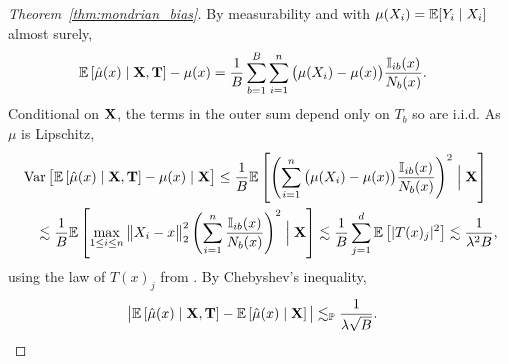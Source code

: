 \begin{proof}[Theorem~\ref{thm:mondrian_bias}]


  By measurability and with $\mu(X_i) = \mathbb{E}[Y_i \mid X_i]$ almost surely,
  \begin{align*}
    \mathbb{E} \left[ \hat \mu(x) \mid \mathbf{X}, \mathbf{T} \right]
    - \mu(x)
    &=
    \frac{1}{B}
    \sum_{b=1}^B
    \sum_{i=1}^n \big( \mu(X_i) - \mu(x) \big)
    \frac{\mathbb{I}_{i b}(x)}{N_b(x)}.
  \end{align*}
  Conditional on $\mathbf{X}$,
  the terms in the outer sum depend only on $T_b$ so are i.i.d.
  As $\mu$ is Lipschitz,
  \begin{align*}
    &\operatorname{Var} \big[
      \mathbb{E} \left[ \hat \mu(x) \mid \mathbf{X}, \mathbf{T} \right]
      - \mu(x)
      \mid \mathbf{X}
    \big]
    \leq
    \frac{1}{B}
    \mathbb{E} \left[
      \left(
        \sum_{i=1}^n \big( \mu(X_i) - \mu(x) \big)
        \frac{\mathbb{I}_{i b}(x)}{N_b(x)}
      \right)^2
      \Bigm| \mathbf{X}
    \right] \\
    &\quad\lesssim
    \frac{1}{B}
    \mathbb{E} \left[
      \max_{1 \leq i \leq n}
      \big\| X_i - x \big\|_2^2
      \left(
        \sum_{i=1}^n
        \frac{\mathbb{I}_{i b}(x)}{N_b(x)}
      \right)^2
      \Bigm| \mathbf{X}
    \right]
    \lesssim
    \frac{1}{B}
    \sum_{j=1}^{d}
    \mathbb{E} \left[
      |T(x)_j|^2
    \right]
    \lesssim
    \frac{1}{\lambda^2 B},
  \end{align*}
  using the law of $T(x)_j$ from \citet[Proposition~1]{mourtada2020minimax}.
  By Chebyshev's inequality,
  \begin{align*}
    \big|
    \mathbb{E} \left[ \hat \mu(x) \mid \mathbf{X}, \mathbf{T} \right]
    - \mathbb{E} \left[ \hat \mu(x) \mid \mathbf{X} \right]
    \big|
    &\lesssim_{\mathbb{P}}
    \frac{1}{\lambda \sqrt B}.
  \end{align*}



\end{proof}
